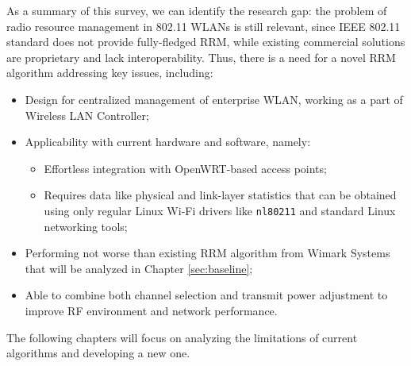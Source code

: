 As a summary of this survey, we can identify the research gap: the problem of radio resource management in 802.11 WLANs is still relevant, since IEEE 802.11 standard does not provide fully-fledged RRM, while existing commercial solutions are proprietary and lack interoperability. Thus, there is a need for a novel RRM algorithm addressing key issues, including:
\begin{itemize}
    \item Design for centralized management of enterprise WLAN, working as a part of Wireless LAN Controller;
    \item Applicability with current hardware and software, namely:
    \begin{itemize}
        \item Effortless integration with OpenWRT-based access points;
        \item Requires data like physical and link-layer statistics that can be obtained using only regular Linux Wi-Fi drivers like \texttt{nl80211} and standard Linux networking tools;
    \end{itemize}
    \item Performing not worse than existing RRM algorithm from Wimark Systems that will be analyzed in Chapter \ref{sec:baseline};
    \item Able to combine both channel selection and transmit power adjustment to improve RF environment and network performance.
\end{itemize}

The following chapters will focus on analyzing the limitations of current algorithms and developing a new one.